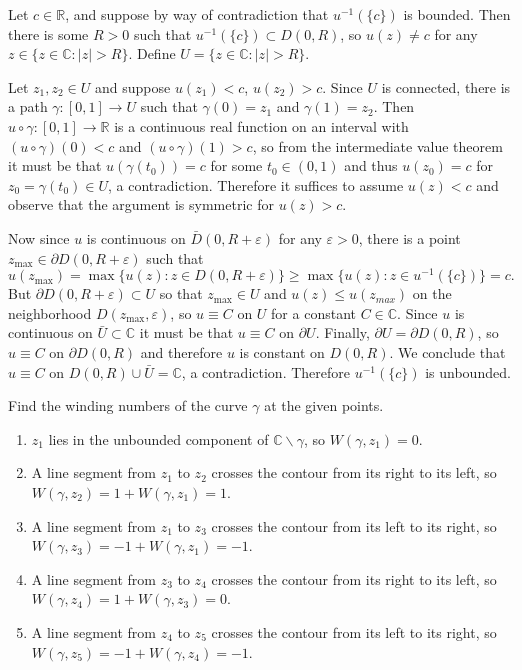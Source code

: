 \documentclass{article}
\newcounter{Problem}
\newenvironment{Problem}{\begin{Exercise}[name={Problem},
                                          counter={Problem}]}
                        {\end{Exercise}}
\begin{document}
\begin{Answer}
Let $c \in \mathbb{R}$, and suppose by way of contradiction that
$u^{-1}(\{ c \})$ is bounded. Then there is some $R > 0$ such that
$u^{-1}(\{ c \}) \subset D(0, R)$, so $u(z) \neq c$ for any
$z \in \{ z \in \mathbb{C} : |z| > R \}$. Define
$U = \{ z \in \mathbb{C} : |z| > R \}$.

Let $z_1, z_2 \in U$ and suppose $u(z_1) < c$, $u(z_2) > c$.
Since $U$ is connected, there is a path
$\gamma : [0, 1] \to U$ such that $\gamma(0) = z_1$ and
$\gamma(1) = z_2$. Then
$u \circ \gamma : [0, 1] \to \mathbb{R}$ is a continuous
real function on an interval
with $(u \circ \gamma)(0) < c$ and
$(u \circ \gamma)(1) > c$, so from the intermediate value
theorem it must be that $u(\gamma(t_0)) = c$ for some
$t_0 \in (0, 1)$ and thus
$u(z_0) = c$ for $z_0 = \gamma(t_0) \in U$, a contradiction.
Therefore it suffices to assume $u(z) < c$
and observe that the argument is symmetric for $u(z) > c$.

Now since $u$ is continuous on $\bar{D}(0, R + \varepsilon)$
for any $\varepsilon > 0$, there is a
point $z_{\max} \in \partial D(0, R + \varepsilon)$ such that
$$
     u(z_{\max}) 
=    \max\{ u(z) : z \in D(0, R + \varepsilon) \} 
\geq \max\{ u(z) : z \in u^{-1}(\{c\}) \}
=    c.
$$
But $\partial D(0, R + \varepsilon) \subset U$ so that
$z_{\max} \in U$ and $u(z) \leq u(z_{max})$
on the neighborhood $D(z_{\max}, \varepsilon)$,
so $u \equiv C$ on $U$ for a constant
$C \in \mathbb{C}$. Since $u$ is continuous on
$\bar{U} \subset \mathbb{C}$ it must be that $u \equiv C$ on
$\partial U$.
Finally, $\partial U = \partial D(0, R)$, so $u \equiv C$ on
$\partial D(0, R)$ and therefore $u$ is constant on $D(0, R)$.
We conclude that $u \equiv C$ on
$D(0, R) \cup \bar{U} = \mathbb{C}$, a contradiction.
Therefore $u^{-1}(\{ c \})$ is unbounded.
\end{Answer}

\begin{Problem}
Find the winding numbers of the curve $\gamma$ at the given points.
\end{Problem}

\begin{Answer}
\begin{enumerate}
  \item{
    $z_1$ lies in the unbounded component of
    $\mathbb{C} \backslash \gamma$, so $W(\gamma, z_1) = 0$.
  }
  \item{
    A line segment from $z_1$ to $z_2$ crosses the contour from its
    right to its left, so $W(\gamma, z_2) = 1 + W(\gamma, z_1) = 1$.
  }
  \item{
    A line segment from $z_1$ to $z_3$ crosses the contour from its
    left to its right, so $W(\gamma, z_3) = -1 + W(\gamma, z_1) = -1$.
  }
  \item{
    A line segment from $z_3$ to $z_4$ crosses the contour from its
    right to its left, so $W(\gamma, z_4) = 1 + W(\gamma, z_3) = 0$.
  }
  \item{
    A line segment from $z_4$ to $z_5$ crosses the contour from its
    left to its right, so $W(\gamma, z_5) = -1 + W(\gamma, z_4) = -1$.
  }
\end{enumerate}
\end{Answer}
\end{document}
